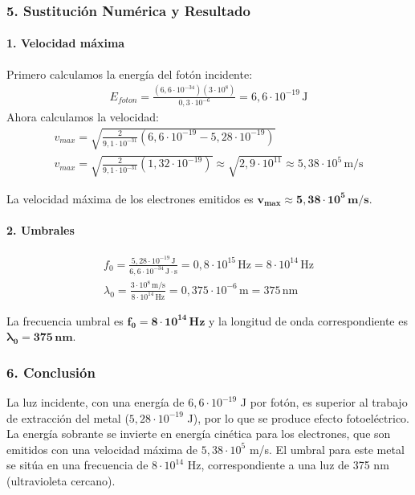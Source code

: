 \subsubsection*{5. Sustitución Numérica y Resultado}
\paragraph*{1. Velocidad máxima}
Primero calculamos la energía del fotón incidente:
\begin{gather}
    E_{foton} = \frac{(6,6\cdot10^{-34})(3\cdot10^8)}{0,3\cdot10^{-6}} = 6,6\cdot10^{-19}\,\text{J}
\end{gather}
Ahora calculamos la velocidad:
\begin{gather}
    v_{max} = \sqrt{\frac{2}{9,1\cdot10^{-31}}\left(6,6\cdot10^{-19} - 5,28\cdot10^{-19}\right)} \\
    v_{max} = \sqrt{\frac{2}{9,1\cdot10^{-31}}(1,32\cdot10^{-19})} \approx \sqrt{2,9\cdot10^{11}} \approx 5,38\cdot10^5\,\text{m/s}
\end{gather}
\begin{cajaresultado}
    La velocidad máxima de los electrones emitidos es $\boldsymbol{v_{max} \approx 5,38 \cdot 10^5\,\textbf{m/s}}$.
\end{cajaresultado}

\paragraph*{2. Umbrales}
\begin{gather}
    f_0 = \frac{5,28\cdot10^{-19}\,\text{J}}{6,6\cdot10^{-34}\,\text{J}\cdot\text{s}} = 0,8\cdot10^{15}\,\text{Hz} = 8\cdot10^{14}\,\text{Hz} \\
    \lambda_0 = \frac{3\cdot10^8\,\text{m/s}}{8\cdot10^{14}\,\text{Hz}} = 0,375\cdot10^{-6}\,\text{m} = 375\,\text{nm}
\end{gather}
\begin{cajaresultado}
    La frecuencia umbral es $\boldsymbol{f_0 = 8 \cdot 10^{14}\,\textbf{Hz}}$ y la longitud de onda correspondiente es $\boldsymbol{\lambda_0 = 375\,\textbf{nm}}$.
\end{cajaresultado}

\subsubsection*{6. Conclusión}
\begin{cajaconclusion}
La luz incidente, con una energía de $6,6\cdot10^{-19}$ J por fotón, es superior al trabajo de extracción del metal ($5,28\cdot10^{-19}$ J), por lo que se produce efecto fotoeléctrico. La energía sobrante se invierte en energía cinética para los electrones, que son emitidos con una velocidad máxima de $5,38 \cdot 10^5$ m/s. El umbral para este metal se sitúa en una frecuencia de $8 \cdot 10^{14}$ Hz, correspondiente a una luz de 375 nm (ultravioleta cercano).
\end{cajaconclusion}


